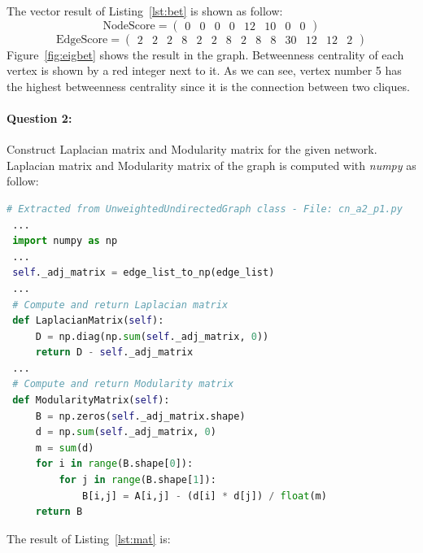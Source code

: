 \documentclass[a4paper,12pt]{article}
\begin{document}
\pagebreak

\noindent
The vector result of Listing~\ref{lst:bet} is shown as follow:
\[ \mbox{NodeScore} = \left( \begin{array}{cccccccc} 0 & 0 & 0 & 0 & 12 & 10 & 0 & 0 \end{array} \right) \]
\[ \mbox{EdgeScore} = \left( \begin{array}{cccccccccccccc} 2 & 2 & 2 & 8 & 2 & 2 & 8 & 2 & 8 & 8 & 30 & 12 & 12 & 2 \end{array} \right) \]
\noindent
Figure~\ref{fig:eigbet} shows the result in the graph. Betweenness centrality of each vertex is shown by a red integer next to it. As we can see, vertex number 5 has the highest betweenness centrality since it is the connection between two cliques.

\paragraph{Question 2:} Construct Laplacian matrix and Modularity matrix for the given network.\\
\noindent
Laplacian matrix and Modularity matrix of the graph is computed with \emph{numpy} as follow:

\begin{lstlisting}[language=Python, caption={Laplacian matrix and Modularity matrix computation with Numpy}, label={lst:mat}]
 # Extracted from UnweightedUndirectedGraph class - File: cn_a2_p1.py
 ...
 import numpy as np
 ...
 self._adj_matrix = edge_list_to_np(edge_list)
 ...
 # Compute and return Laplacian matrix
 def LaplacianMatrix(self):
     D = np.diag(np.sum(self._adj_matrix, 0))
     return D - self._adj_matrix
 ...
 # Compute and return Modularity matrix
 def ModularityMatrix(self):
     B = np.zeros(self._adj_matrix.shape)
     d = np.sum(self._adj_matrix, 0)
     m = sum(d)
     for i in range(B.shape[0]):
         for j in range(B.shape[1]):
             B[i,j] = A[i,j] - (d[i] * d[j]) / float(m)
     return B
\end{lstlisting}

\noindent
The result of Listing~\ref{lst:mat} is:
\end{document}
